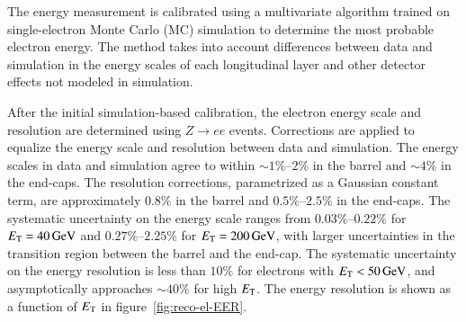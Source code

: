 The energy measurement is calibrated using a multivariate algorithm trained on single-electron Monte Carlo (MC) simulation to determine the most probable electron energy. The method takes into account differences between data and simulation in the energy scales of each longitudinal layer and other detector effects not modeled in simulation. 

After the initial simulation-based calibration, the electron energy scale and resolution are determined using $Z\rightarrow ee$ events. Corrections are applied to equalize the energy scale and resolution between data and simulation. The energy scales in data and simulation agree to within $\sim1\%$--$2\%$ in the barrel and $\sim4\%$ in the end-caps. The resolution corrections, parametrized as a Gaussian constant term, are approximately $0.8\%$ in the barrel and $0.5\%$--$2.5\%$ in the end-caps. The systematic uncertainty on the energy scale ranges from $0.03\%$--$0.22$\% for $E_{\mathrm{T}}=\SI{40}{\giga\electronvolt}$ and $0.27\%$--$2.25$\% for $E_{\mathrm{T}} = \SI{200}{\giga\electronvolt}$, with larger uncertainties in the transition region between the barrel and the end-cap. The systematic uncertainty on the energy resolution is less than $10\%$ for electrons with $E_{\mathrm{T}}<\SI{50}{\giga\electronvolt}$, and asymptotically approaches $\sim 40\%$ for high $E_{\mathrm{T}}$.  The energy resolution is shown as a function of $E_{\text{T}}$ in figure~\ref{fig:reco-el-EER}.

